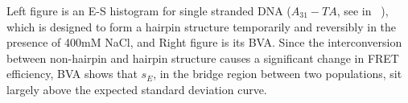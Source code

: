 Left figure is an E-S histogram for single stranded DNA ($A_31 -TA$, see in ~\cite{Tsukanov_2013}), which is designed to form a hairpin structure temporarily and reversibly in the presence of 400mM NaCl, and Right figure is its BVA. Since the interconversion between non-hairpin and hairpin structure causes a significant change in FRET efficiency, BVA shows that $s_E$, in the bridge region between two populations, sit largely above the expected standard deviation curve.